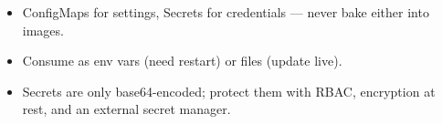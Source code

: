 \begin{recap}
\begin{itemize}
  \item ConfigMaps for settings, Secrets for credentials --- never bake either into images.
  \item Consume as env vars (need restart) or files (update live).
  \item Secrets are only base64-encoded; protect them with RBAC, encryption at
        rest, and an external secret manager.
\end{itemize}
\end{recap}
